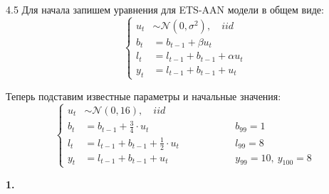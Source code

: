 \begin{solution}{{4.5}}
Для начала запишем уравнения для ETS-AAN модели в общем виде:
\[
    \left\{\begin{aligned}
        u_t &\sim \mathcal{N}(0, \sigma^2), \quad iid \\
        b_t &= b_{t-1} + \beta u_t \\
        l_t &= l_{t-1} + b_{t-1} + \alpha u_t \\
        y_t &= l_{t-1} + b_{t-1} + u_t
    \end{aligned}\right.
\]

Теперь подставим известные параметры и начальные значения:
\[
    \left\{\begin{aligned}
        u_t &\sim \mathcal{N}(0, 16), \quad iid \\
        b_t &= b_{t-1} + \frac{3}{4} \cdot u_t && b_{99}=1 \\
        l_t &= l_{t-1} + b_{t-1} + \frac{1}{2} \cdot u_t \qquad \qquad && l_{99}=8 \\
        y_t &= l_{t-1} + b_{t-1} + u_t && y_{99}=10, \ y_{100}=8
    \end{aligned}\right.
\]

\textbf{1.}


\end{solution}
